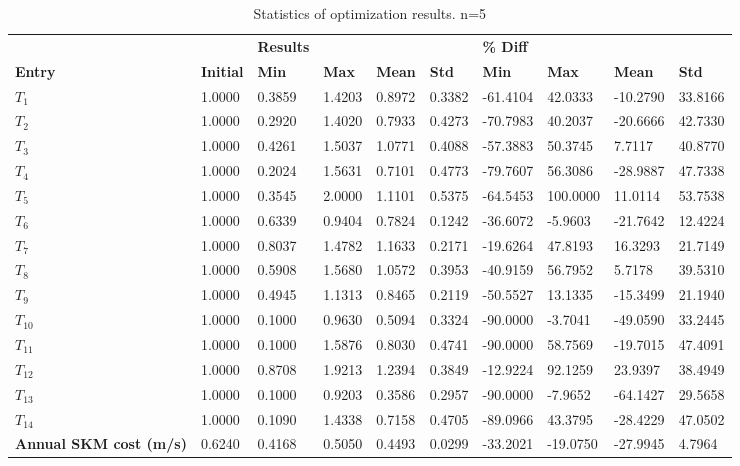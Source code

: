 \begin{table}[H]
\centering
\begin{tabular}{llllllllll}
\textbf{} & \textbf{} & \cellcolor[HTML]{EFEFEF}\textbf{Results} & \cellcolor[HTML]{EFEFEF} & \cellcolor[HTML]{EFEFEF} & \cellcolor[HTML]{EFEFEF} & \cellcolor[HTML]{EFEFEF}\textbf{\% Diff} & \cellcolor[HTML]{EFEFEF} & \cellcolor[HTML]{EFEFEF} & \cellcolor[HTML]{EFEFEF} \\
\rowcolor[HTML]{EFEFEF} 
\textbf{Entry} & \textbf{Initial} & \textbf{Min} & \textbf{Max} & \textbf{Mean} & \textbf{Std} & \textbf{Min} & \textbf{Max} & \textbf{Mean} & \textbf{Std} \\
$T_{1}$ & 1.0000 & 0.3859 & 1.4203 & 0.8972 & 0.3382 & -61.4104 & 42.0333 & -10.2790 & 33.8166 \\ 
$T_{2}$ & 1.0000 & 0.2920 & 1.4020 & 0.7933 & 0.4273 & -70.7983 & 40.2037 & -20.6666 & 42.7330 \\ 
$T_{3}$ & 1.0000 & 0.4261 & 1.5037 & 1.0771 & 0.4088 & -57.3883 & 50.3745 & 7.7117 & 40.8770 \\ 
$T_{4}$ & 1.0000 & 0.2024 & 1.5631 & 0.7101 & 0.4773 & -79.7607 & 56.3086 & -28.9887 & 47.7338 \\ 
$T_{5}$ & 1.0000 & 0.3545 & 2.0000 & 1.1101 & 0.5375 & -64.5453 & 100.0000 & 11.0114 & 53.7538 \\ 
$T_{6}$ & 1.0000 & 0.6339 & 0.9404 & 0.7824 & 0.1242 & -36.6072 & -5.9603 & -21.7642 & 12.4224 \\ 
$T_{7}$ & 1.0000 & 0.8037 & 1.4782 & 1.1633 & 0.2171 & -19.6264 & 47.8193 & 16.3293 & 21.7149 \\ 
$T_{8}$ & 1.0000 & 0.5908 & 1.5680 & 1.0572 & 0.3953 & -40.9159 & 56.7952 & 5.7178 & 39.5310 \\ 
$T_{9}$ & 1.0000 & 0.4945 & 1.1313 & 0.8465 & 0.2119 & -50.5527 & 13.1335 & -15.3499 & 21.1940 \\ 
$T_{10}$ & 1.0000 & 0.1000 & 0.9630 & 0.5094 & 0.3324 & -90.0000 & -3.7041 & -49.0590 & 33.2445 \\ 
$T_{11}$ & 1.0000 & 0.1000 & 1.5876 & 0.8030 & 0.4741 & -90.0000 & 58.7569 & -19.7015 & 47.4091 \\ 
$T_{12}$ & 1.0000 & 0.8708 & 1.9213 & 1.2394 & 0.3849 & -12.9224 & 92.1259 & 23.9397 & 38.4949 \\ 
$T_{13}$ & 1.0000 & 0.1000 & 0.9203 & 0.3586 & 0.2957 & -90.0000 & -7.9652 & -64.1427 & 29.5658 \\ 
$T_{14}$ & 1.0000 & 0.1090 & 1.4338 & 0.7158 & 0.4705 & -89.0966 & 43.3795 & -28.4229 & 47.0502 \\ 
\rowcolor[HTML]{EFEFEF} 
\textbf{Annual SKM cost (m/s)} & 0.6240 & 0.4168 & 0.5050 & 0.4493 & 0.0299 & -33.2021 & -19.0750 & -27.9945 & 4.7964 \\ 
\end{tabular}
\caption{Statistics of optimization results. n=5}
\label{tab:StatisticsOptimizationAnalysis}
\end{table}